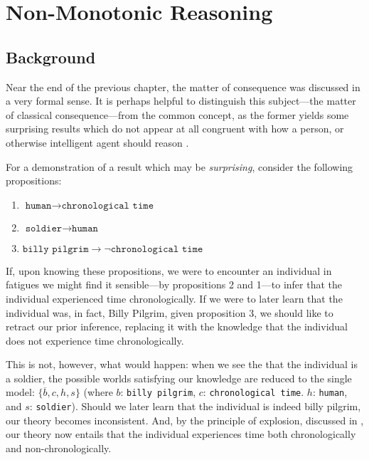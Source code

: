 \chapter{Non-Monotonic Reasoning}
\label{chapter:non-monotonic-reasoning}

\section{Background}
\label{section:nmr-background}
Near the end of the previous chapter, the matter of consequence was discussed in a very formal sense. It is perhaps helpful to distinguish this subject---the matter of classical consequence---from the common concept, as the former yields some surprising results which do not appear at all congruent with how a person, or otherwise intelligent agent should reason \cite{turquette1957logic, kraus1990nonmonotonic}.

For a demonstration of a result which may be \textit{surprising}, consider the following propositions: 
\begin{enumerate}
     \item $\texttt{human} \rightarrow \texttt{chronological time}$
     \item $\texttt{soldier} \rightarrow \texttt{human}$
     \item $\texttt{billy pilgrim} \rightarrow \neg \texttt{chronological time}$
\end{enumerate}
If, upon knowing these propositions, we were to encounter an individual in fatigues we might find it sensible---by propositions 2 and 1---to infer that the individual experienced time chronologically. If we were to later learn that the individual was, in fact, Billy Pilgrim, given proposition 3, we should like to retract our prior inference, replacing it with the knowledge that the individual does not experience time chronologically. 

This is not, however, what would happen: when we see the that the individual is a soldier, the possible worlds satisfying our knowledge are reduced to the single model: $\{\overline{b},c,h,s\}$ (where $b$: \texttt{billy pilgrim}, $c$: \texttt{chronological time}. $h$: \texttt{human}, and $s$: \texttt{soldier}). Should we later learn that the individual is indeed billy pilgrim, our theory becomes inconsistent. 
And, by the principle of explosion, discussed in , our theory now entails that the individual experiences time both chronologically and non-chronologically. 

